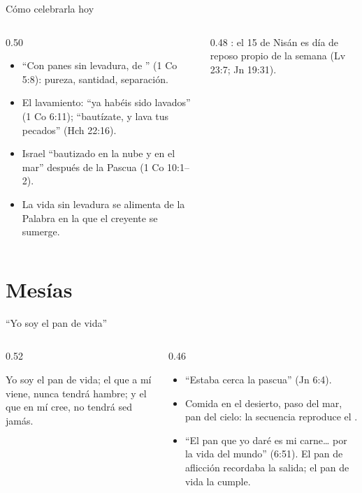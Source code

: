 \begin{frame}{Cómo celebrarla hoy}
\begin{columns}[t,onlytextwidth]
\begin{column}{0.50\textwidth}\small
\begin{itemize}
\item ``Con panes sin levadura, de '' (1 Co 5:8): pureza, santidad, separación.
\item El lavamiento: ``ya habéis sido lavados'' (1 Co 6:11); ``bautízate, y lava tus pecados'' (Hch 22:16).
\item Israel ``bautizado en la nube y en el mar'' después de la Pascua (1 Co 10:1--2).
\item La vida sin levadura se alimenta de la Palabra en la que el creyente se sumerge.
\end{itemize}
\end{column}
\begin{column}{0.48\textwidth}\scriptsize
{}: el 15 de Nisán es día de reposo propio de la semana (Lv 23:7; Jn 19:31).\par\medskip
{}
\end{column}
\end{columns}
\end{frame}

\section{Mesías}

\begin{frame}{``Yo soy el pan de vida''}
\begin{columns}[t,onlytextwidth]
\begin{column}{0.52\textwidth}
\centering{}
\begin{cita}Yo soy el pan de vida; el que a mí viene, nunca tendrá hambre; y el que en mí cree, no tendrá sed jamás.\end{cita}
\end{column}
\begin{column}{0.46\textwidth}\small
\begin{itemize}
\item ``Estaba cerca la pascua'' (Jn 6:4).
\item Comida en el desierto, paso del mar, pan del cielo: la secuencia reproduce el .
\item ``El pan que yo daré es mi carne\ldots{} por la vida del mundo'' (6:51). El pan de aflicción recordaba la salida; el pan de vida la cumple.
\end{itemize}
\end{column}
\end{columns}
\end{frame}

